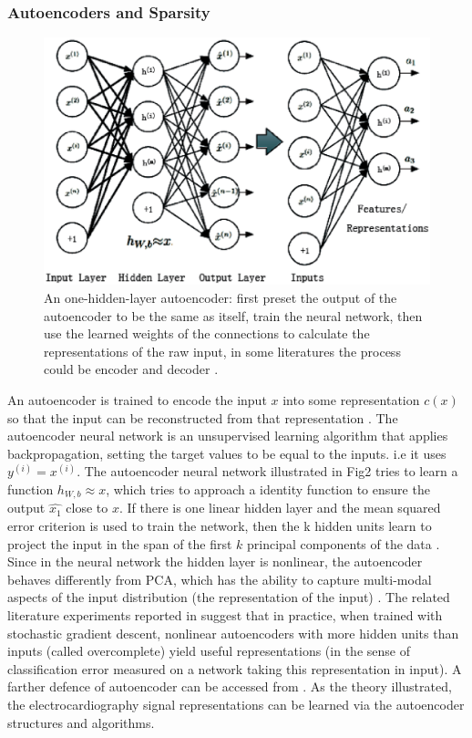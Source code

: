 \documentclass[journal]{IEEEtran}
\begin{document}
\subsubsection{Autoencoders and Sparsity}
\begin{figure}[]
\centering
\includegraphics[width=3.2 in]{eps/Figure1.eps}
\caption{An one-hidden-layer autoencoder: first preset the output of the autoencoder to be the same as itself, train the neural network, then use the learned weights of the connections to calculate the representations of the raw input, in some literatures the process could be encoder and decoder \cite{bengio2009}.}
\label{figure1}
\end{figure}

An autoencoder is trained to encode the input $x$ into some representation $c(x)$ so that the input can be reconstructed from that representation \cite{bengio2009}. 
The autoencoder neural network is an unsupervised learning algorithm that applies backpropagation, setting the target values to be equal to the inputs. i.e it uses $y^{(i)}=x^{(i)}$. The autoencoder neural network illustrated in Fig2 tries to learn a function $h_{W,b}{\approx}x$, which tries to approach a identity function to ensure the output $\hat{x_1}$ close to $x$. If there is one linear hidden layer and the mean squared error criterion is used to train the network, then the k hidden units learn to project the input in the span of the first $k$ principal components of the data \cite{bourlard}. Since in the neural network the hidden layer is nonlinear, the autoencoder behaves differently from PCA, which has the ability to capture multi-modal aspects of the input distribution (the representation of the input) \cite{jap}. The related literature experiments reported in \cite{bengio2007} suggest that in practice, when trained with stochastic gradient descent, nonlinear autoencoders with more hidden units than inputs (called overcomplete) yield useful representations (in the sense of classification error measured on a network taking this representation in input). A farther defence of autoencoder can be accessed from \cite{bengio2009}.
As the theory illustrated, the electrocardiography signal representations can be learned via the autoencoder structures and algorithms. 
\end{document}
